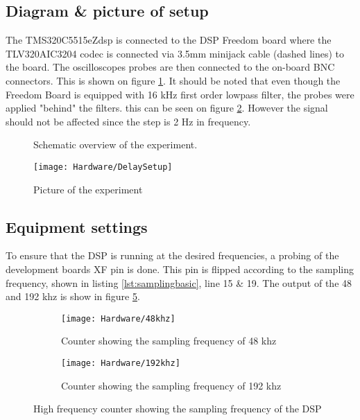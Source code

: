 \subsection{Diagram \& picture of setup}

The TMS320C5515eZdsp is connected to the DSP Freedom board where the TLV320AIC3204 codec is connected via 3.5mm minijack cable (dashed lines) to the board. The oscilloscopes probes are then connected to the on-board BNC connectors. This is shown on figure \ref{fig:SchematicDelayExperiment}. It should be noted that even though the Freedom Board is equipped with 16 kHz first order lowpass filter, the probes were applied "behind" the filters. this can be seen on figure \ref{fig:DelayExperimentSetup}. However the signal should not be affected since the step is 2 Hz in frequency. 

\begin{figure}[H]
	\centering
	
	\caption{Schematic overview of the experiment.}
	\label{fig:SchematicDelayExperiment}
\end{figure}


\begin{figure}[H]
	\centering
\texttt{[image: Hardware/DelaySetup]}
	\caption{Picture of the experiment}
	\label{fig:DelayExperimentSetup}
\end{figure}


\subsection{Equipment settings}

To ensure that the DSP is running at the desired frequencies, a probing of the development boards XF pin is done. This pin is flipped according to the sampling frequency, shown in listing \ref{lst:samplingbasic}, line 15 \& 19. The output of the 48 and 192 khz is show in figure \ref{fig:countingthefs}. 
\begin{figure}[H]
	\centering
	\begin{subfigure}[b]{.45\textwidth}
		\centering
		\texttt{[image: Hardware/48khz]}
		\caption{Counter showing the sampling frequency of 48 khz}
		\label{fig:48khzcounter}
	\end{subfigure}
	\hfill
	\begin{subfigure}[b]{.45\textwidth}
		\centering
		\texttt{[image: Hardware/192khz]}
		\caption{Counter showing the sampling frequency of 192 khz}
		\label{fig:192khzcounter}
	\end{subfigure}	
	\caption{High frequency counter showing the sampling frequency of the DSP}
	\label{fig:countingthefs}
\end{figure}

